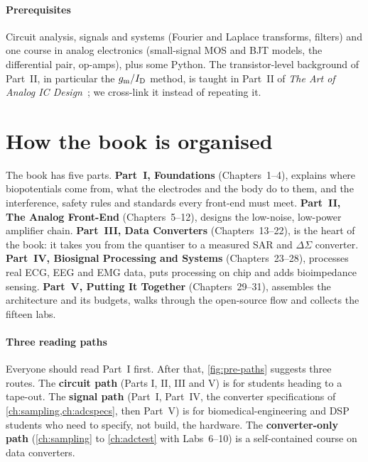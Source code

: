 \paragraph{Prerequisites} Circuit analysis, signals and systems (Fourier and Laplace transforms, filters) and one course in analog electronics (small-signal MOS and BJT models, the differential pair, op-amps), plus some Python. The transistor-level background of Part~II, in particular the $g_\mathrm{m}/I_\mathrm{D}$ method, is taught in Part~II of \emph{The Art of Analog IC Design}~\cite{artofaicd}; we cross-link it instead of repeating it.

\section*{How the book is organised}
The book has five parts. \textbf{Part~I, Foundations} (Chapters~1--4), explains where biopotentials come from, what the electrodes and the body do to them, and the interference, safety rules and standards every front-end must meet. \textbf{Part~II, The Analog Front-End} (Chapters~5--12), designs the low-noise, low-power amplifier chain. \textbf{Part~III, Data Converters} (Chapters~13--22), is the heart of the book: it takes you from the quantiser to a measured SAR and $\Delta\Sigma$ converter. \textbf{Part~IV, Biosignal Processing and Systems} (Chapters~23--28), processes real ECG, EEG and EMG data, puts processing on chip and adds bioimpedance sensing. \textbf{Part~V, Putting It Together} (Chapters~29--31), assembles the architecture and its budgets, walks through the open-source flow and collects the fifteen labs.

\paragraph{Three reading paths} Everyone should read Part~I first. After that, \cref{fig:pre-paths} suggests three routes. The \textbf{circuit path} (Parts I, II, III and V) is for students heading to a tape-out. The \textbf{signal path} (Part~I, Part~IV, the converter specifications of \cref{ch:sampling,ch:adcspecs}, then Part~V) is for biomedical-engineering and DSP students who need to specify, not build, the hardware. The \textbf{converter-only path} (\cref{ch:sampling} to \cref{ch:adctest} with Labs~6--10) is a self-contained course on data converters.

